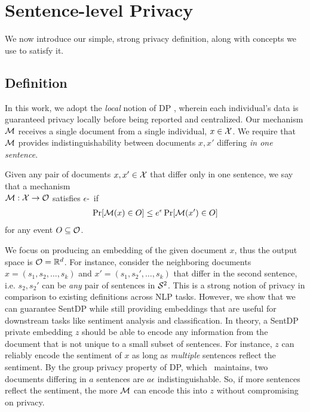 \section{Sentence-level Privacy}
We now introduce our simple, strong privacy definition, along with concepts we use to satisfy it. 
\subsection{Definition}
In this work, we adopt the \emph{local} notion of DP \cite{ldp}, wherein each individual's data is guaranteed privacy locally before being reported and centralized. Our mechanism $\mathcal{M}$ receives a single document from a single individual, $x \in \mathcal{X}$. We require that $\mathcal{M}$ provides indistinguishability between documents $x, x'$ differing \emph{in one sentence}. 

\begin{definition}
Given any pair of documents $x, x' \in \mathcal{X}$ that differ only in one sentence, we say that a mechanism\\ $\mathcal{M} : \mathcal{X} \rightarrow \mathcal{O}$ satisfies $\epsilon$-\SDP~if 
	\begin{align*}
		\Pr[\mathcal{M}(x) \in O] \leq e^\epsilon \Pr[\mathcal{M}(x') \in O]
	\end{align*}
	for any event $O \subseteq \mathcal{O}$. 
\end{definition}

We focus on producing an embedding of the given document $x$, thus the output space is $\mathcal{O} = {\mathbb R}^d$. For instance, consider the neighboring documents $x = (s_1, s_2, \dots, s_k)$ and $x' = (s_1, s_2', \dots, s_k)$ that differ in the second sentence, i.e. $s_2, s_2'$ can be \emph{any} pair of sentences in $\mathcal{S}^2$. 
This is a strong notion of privacy in comparison to existing definitions across NLP tasks. However, we show that we can guarantee SentDP while still providing embeddings that are useful for downstream tasks like sentiment analysis and classification. In theory, a SentDP private embedding $z$ should be able to encode any information from the document that is not unique to a small subset of sentences. For instance, $z$ can reliably encode the sentiment of $x$ as long as \emph{multiple} sentences reflect the sentiment. By the group privacy property of DP, which \SDP~maintains, two documents differing in $a$ sentences are $a\epsilon$ indistinguishable. So, if more sentences reflect the sentiment, the more $\mathcal{M}$ can encode this into $z$ without compromising on privacy. 

